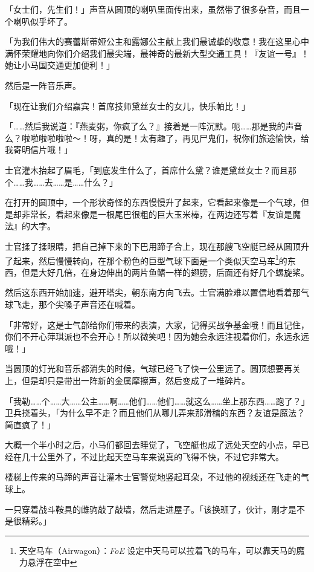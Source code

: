 「女士们，先生们！」声音从圆顶的喇叭里面传出来，虽然带了很多杂音，而且一个喇叭似乎坏了。

「为我们伟大的赛蕾斯蒂娅公主和露娜公主献上我们最诚挚的敬意！我在这里心中满怀荣耀地向你们介绍我们最尖端，最神奇的最新大型交通工具！『友谊一号』！她让小马国交通更加便利！」

然后是一阵音乐声。

「现在让我们介绍嘉宾！首席技师黛丝女士的女儿，快乐帕比！」

「……然后我说道：『燕麦粥，你疯了么？』接着是一阵沉默。呃……那是我的声音么？啦啦啦啦啦啦～！呀，真的是！太有趣了，再见尸鬼们，祝你们旅途愉快，给我寄明信片哦！」

士官灌木抬起了眉毛，「到底发生什么了，首席什么黛？谁是黛丝女士？而且那个……我……去……是……什么？」

在打开的圆顶中，一个形状奇怪的东西慢慢升了起来，它看起来像是一个气球，但是却非常长，看起来像是一根尾巴很粗的巨大玉米棒，在两边还写着『友谊是魔法』的大字。

士官揉了揉眼睛，把自己掉下来的下巴用蹄子合上，现在那艘飞空艇已经从圆顶升了起来，然后慢慢转向，在那个粉色的巨型气球下面是一个类似天空马车\footnote{天空马车（Airwagon）：\emph{FoE} 设定中天马可以拉着飞的马车，可以靠天马的魔力悬浮在空中}的东西，但是大好几倍，在身边伸出的两片鱼鳍一样的翅膀，后面还有好几个螺旋桨。

然后这东西开始加速，避开塔尖，朝东南方向飞去。士官满脸难以置信地看着那气球飞走，那个尖嗓子声音还在喊着。

「非常好，这是士气部给你们带来的表演，大家，记得买战争基金哦！而且记住，你们不开心萍琪派也不会开心！所以微笑吧！因为她会永远注视着你们，永远永远哦！」

当圆顶的灯光和音乐都消失的时候，气球已经飞了快一公里远了。圆顶想要再关上，但是却只是带出一阵新的金属摩擦声，然后变成了一堆碎片。

「我勒……个……大……公主……啊……他们……他们……就这么……坐上那东西……跑了？」卫兵挠着头，「为什么早不走？而且他们从哪儿弄来那滑稽的东西？友谊是魔法？简直疯了！」


\horizonline

大概一个半小时之后，小马们都回去睡觉了，飞空艇也成了远处天空的小点，早已经在几十公里外了，不过比起天空马车来说真的飞得不快，不过它非常大。

楼梯上传来的马蹄的声音让灌木士官警觉地竖起耳朵，不过他的视线还在飞走的气球上。

一只穿着战斗鞍具的雌驹敲了敲墙，然后走进屋子。「该换班了，伙计，刚才是不是很精彩。」

